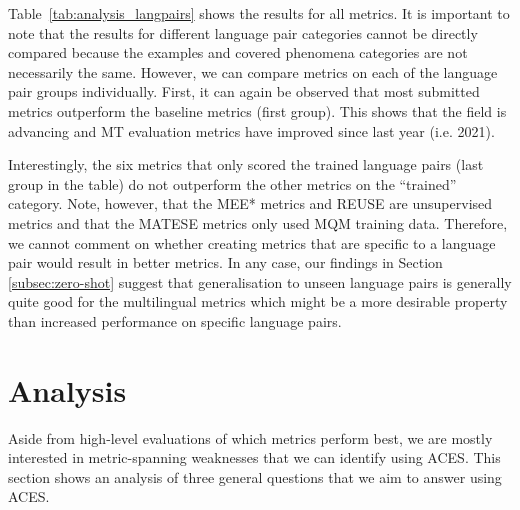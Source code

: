 \documentclass[11pt]{article}
\begin{document}
Table~\ref{tab:analysis_langpairs} shows the results for all metrics. It is important to note that the results for different language pair categories cannot be directly compared because the examples and covered phenomena categories are not necessarily the same. However, we can compare metrics on each of the language pair groups individually. First, it can again be observed that most submitted metrics outperform the baseline metrics (first group). This shows that the field is advancing and MT evaluation metrics have improved since last year (i.e. 2021).

Interestingly, the six metrics that only scored the trained language pairs (last group in the table) do not outperform the other metrics on the ``trained'' category. Note, however, that the \textsc{MEE*} metrics and \textsc{REUSE} are unsupervised metrics and that the \textsc{MATESE} metrics only used MQM training data. Therefore, we cannot comment on whether creating metrics that are specific to a language pair would result in better metrics. In any case, our findings in Section \ref{subsec:zero-shot} suggest that generalisation to unseen language pairs is generally quite good for the multilingual metrics which might be a more desirable property than increased performance on specific language pairs.


\section{Analysis}
\label{sec:analysis}
Aside from high-level evaluations of which metrics perform best, we are mostly interested in metric-spanning weaknesses that we can identify using \textsc{ACES}. This section shows an analysis of three general questions that we aim to answer using \textsc{ACES}.
\end{document}
